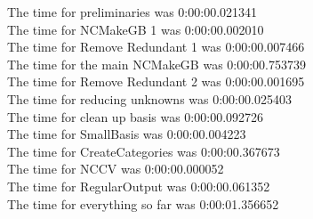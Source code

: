 \documentclass[rep10,leqno]{report}
\begin{document}
\noindent
The time for preliminaries was 0:00:00.021341\\
The time for NCMakeGB 1 was 0:00:00.002010\\
The time for Remove Redundant 1 was 0:00:00.007466\\
The time for the main NCMakeGB was 0:00:00.753739\\
The time for Remove Redundant 2 was 0:00:00.001695\\
The time for reducing unknowns was 0:00:00.025403\\
The time for clean up basis was 0:00:00.092726\\
The time for SmallBasis was 0:00:00.004223\\
The time for CreateCategories was 0:00:00.367673\\
The time for NCCV was 0:00:00.000052\\
The time for RegularOutput was 0:00:00.061352\\
The time for everything so far was 0:00:01.356652\\
\end{document}

